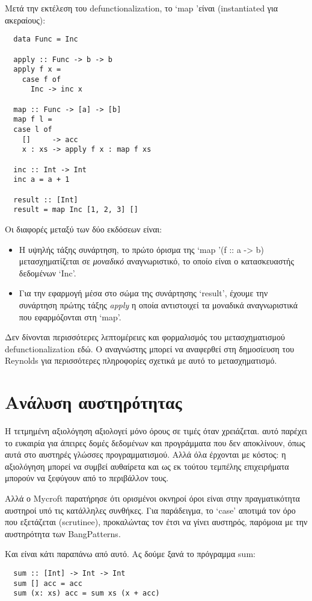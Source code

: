 \documentclass[diploma]{softlab-thesis}
\begin{document}
Μετά την εκτέλεση του defunctionalization, το `map 'είναι (instantiated για ακεραίους):
\begin{verbatim}
  data Func = Inc 

  apply :: Func -> b -> b
  apply f x =
    case f of
      Inc -> inc x

  map :: Func -> [a] -> [b]
  map f l =
  case l of
    []     -> acc
    x : xs -> apply f x : map f xs

  inc :: Int -> Int 
  inc a = a + 1

  result :: [Int]
  result = map Inc [1, 2, 3] []
\end{verbatim}

Οι διαφορές μεταξύ των δύο εκδόσεων είναι:
\begin{itemize}
\item Η υψηλής τάξης συνάρτηση, το πρώτο όρισμα της `map '(f :: a -> b)
μετασχηματίζεται σε \textit{μοναδικό} αναγνωριστικό, το οποίο είναι ο κατασκευαστής δεδομένων `Inc'.
\item Για την εφαρμογή μέσα στο σώμα της συνάρτησης `result', έχουμε την συνάρτηση πρώτης τάξης 
\textit{apply} η οποία αντιστοιχεί τα μοναδικά αναγνωριστικά που εφαρμόζονται στη `map'.
\end{itemize}

Δεν δίνονται περισσότερες λεπτομέρειες και φορμαλισμός του μετασχηματισμού defunctionalization εδώ.
Ο αναγνώστης μπορεί να αναφερθεί στη δημοσίευση του Reynolds για περισσότερες πληροφορίες 
σχετικά με αυτό το μετασχηματισμό.

\section{Ανάλυση αυστηρότητας}

Η τετμημένη αξιολόγηση αξιολογεί μόνο όρους σε τιμές όταν χρειάζεται. αυτό παρέχει το
ευκαιρία για άπειρες δομές δεδομένων και προγράμματα που δεν αποκλίνουν, όπως αυτά στο
αυστηρές γλώσσες προγραμματισμού. Αλλά όλα έρχονται με κόστος: η αξιολόγηση μπορεί να συμβεί
αυθαίρετα και ως εκ τούτου τεμπέλης επιχειρήματα μπορούν να ξεφύγουν από το περιβάλλον τους.

Αλλά ο Mycroft παρατήρησε ότι ορισμένοι οκνηροί όροι είναι στην πραγματικότητα αυστηροί υπό τις 
κατάλληλες συνθήκες. Για παράδειγμα, το `case' αποτιμά τον όρο που εξετάζεται (scrutinee),
προκαλώντας τον έτσι να γίνει αυστηρός, παρόμοια με την αυστηρότητα των BangPatterns.

Και είναι κάτι παραπάνω από αυτό. Ας δούμε ξανά το πρόγραμμα sum:
\begin{verbatim}
  sum :: [Int] -> Int -> Int
  sum [] acc = acc
  sum (x: xs) acc = sum xs (x + acc)
\end{verbatim}
\end{document}
